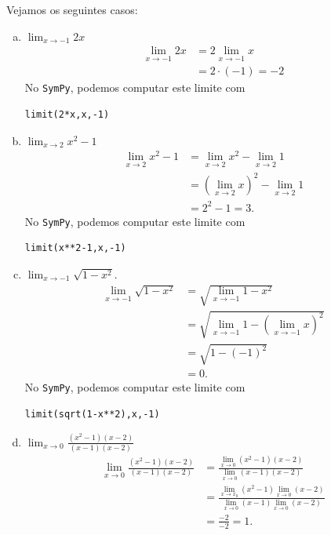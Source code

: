 \begin{ex}
  Vejamos os seguintes casos:
  \begin{enumerate}[a)]
  \item $\displaystyle \lim_{x\to -1} 2x$
  \begin{align}
    \lim_{x\to -1} 2x &= 2\lim_{x\to -1} x\\
    &= 2\cdot(-1) = -2
  \end{align}
  \ifispython
  No \verb+SymPy+, podemos computar este limite com
\begin{verbatim}
limit(2*x,x,-1)
\end{verbatim}
  \fi
\item $\displaystyle \lim_{x\to 2} x^2 - 1$
  \begin{align}
    \lim_{x\to 2} x^2 - 1 &= \lim_{x\to 2} x^2 - \lim_{x\to 2} 1\\
                          &= \left(\lim_{x\to 2} x\right)^2 - \lim_{x\to 2} 1\\
    &= 2^2 - 1 = 3.
  \end{align}
  \ifispython
  No \verb+SymPy+, podemos computar este limite com
\begin{verbatim}
limit(x**2-1,x,-1)
\end{verbatim}
  \fi
\item $\displaystyle \lim_{x\to -1} \sqrt{1-x^2}$.
  \begin{align}
    \lim_{x\to -1} \sqrt{1-x^2} &= \sqrt{\lim_{x\to -1} 1-x^2}\\
                                &= \sqrt{\lim_{x\to -1} 1 - \left(\lim_{x\to -1} x\right)^2}\\
                                &= \sqrt{1 - (-1)^2} \\
                                &= 0.
  \end{align}
  \ifispython
  No \verb+SymPy+, podemos computar este limite com
\begin{verbatim}
limit(sqrt(1-x**2),x,-1)
\end{verbatim}
  \fi  
\item $\displaystyle \lim_{x\to 0} \frac{(x^2-1)(x-2)}{(x-1)(x-2)}$
  \begin{align}
    \lim_{x\to 0} \frac{(x^2-1)(x-2)}{(x-1)(x-2)} &= \frac{\lim_{x\to 0}(x^2-1)(x-2)}{\lim_{x\to 0} (x-1)(x-2)}\\
                                                  &= \frac{\lim_{x\to x_0} (x^2-1)\lim_{x\to 0}(x-2)}{\lim_{x\to 0}(x-1)\lim_{x\to 0}(x-2)}\\
    &= \frac{-2}{-2} = 1.
  \end{align}
  \end{enumerate}
\end{ex}

